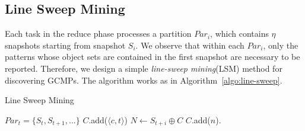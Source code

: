 
\subsection{Line Sweep Mining}
Each task in the reduce phase processes a partition $Par_i$, which contains
$\eta$ snapshots starting from snapshot $S_i$. We observe that within each $Par_i$, 
only the patterns whose object sets are contained in the first snapshot are necessary to be reported. Therefore, we design a simple 
\emph{line-sweep mining}(LSM) method for discovering
GCMPs. The algorithm works as in Algorithm~\ref{algo:line-sweep}.

\begin{algorithm}
\caption{Line Sweep Mining}
\label{algo:line-sweep}
\begin{algorithmic}[1]
\Require $Par_t = \{S_t, S_{t+1}, ...\}$
  \label{code:ls-can-set}
\label{code:ls-init-start}
\State $C$.add($\langle c, t \rangle $)
\EndFor
\label{code:ls-init-end}
\State $N \gets S_{t+i} \oplus C$ \label{code:ls-join}
			$C$.add($n$).
			\label{code:ls-add}
		\EndIf
	\EndFor
{}
	\label{code:ls-remove}
\EndFor
{}
\end{algorithmic}
\end{algorithm}

